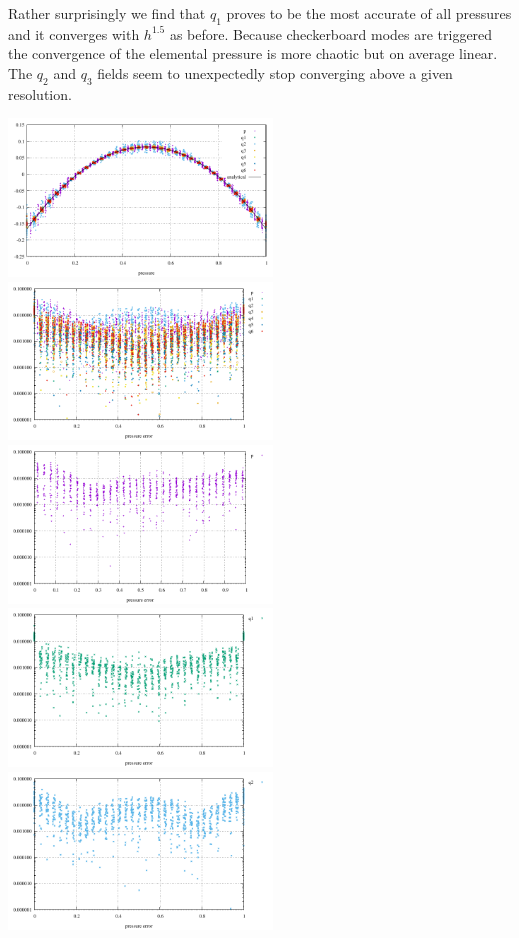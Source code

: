 Rather surprisingly we find that $q_1$ proves to be the most accurate of all pressures and it converges
with $h^{1.5}$ as before. Because checkerboard modes are triggered the convergence of the elemental 
pressure is more chaotic but on average linear. 
The $q_2$ and $q_3$ fields seem to unexpectedly stop converging above a given resolution. 

\begin{center}
\includegraphics[width=7cm]{python_codes/fieldstone_12/results/rand/pressure}
\includegraphics[width=7cm]{python_codes/fieldstone_12/results/rand/pressure_error}\\
\includegraphics[width=7cm]{python_codes/fieldstone_12/results/rand/p_error}
\includegraphics[width=7cm]{python_codes/fieldstone_12/results/rand/q1_error}\\
\includegraphics[width=7cm]{python_codes/fieldstone_12/results/rand/q2_error}

\end{center}
